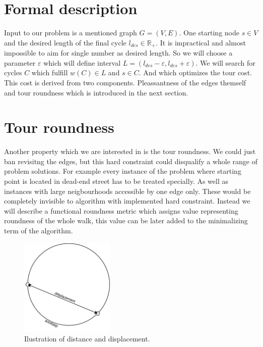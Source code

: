 \documentclass{ctuthesis}
\begin{document}
\section{Formal description}
Input to our problem is a mentioned graph \(G=(V, E)\). One starting node \(s \in V\) and the desired length of the final cycle \(l_{des} \in \mathbb{R_+}\). It is impractical and almost impossible to aim for single number as desired length. So we will choose a parameter \(\varepsilon\) which will define interval \(L = (l_{des}-\varepsilon, l_{des}+\varepsilon)\). We will search for cycles \(C\) which fulfill \(w(C) \in L\) and \(s \in C\). And which optimizes the tour cost. This cost is derived from two components. Pleassantness of the edges themself and tour roundness which is introduced in the next section.
	
\section{Tour roundness}
Another property which we are interested in is the tour roundness. We could just ban revisitng the edges, but this hard constraint could disqualify a whole range of problem solutions. For example every instance of the problem where starting point is located in dead-end street has to be treated specially. As well as instances with large neigbourhoods accessible by one edge only. These would be completely invisible to algorithm with implemented hard constraint. Instead we will describe a functional roundness metric which assigns value representing roundness of the whole walk, this value can be later added to the minimalizing term of the algorithm.\par

\begin{figure}
	\includegraphics[width=0.4\textwidth]{displacement}
	\caption{Ilustration of distance and displacement.}
\end{figure}
\end{document}
